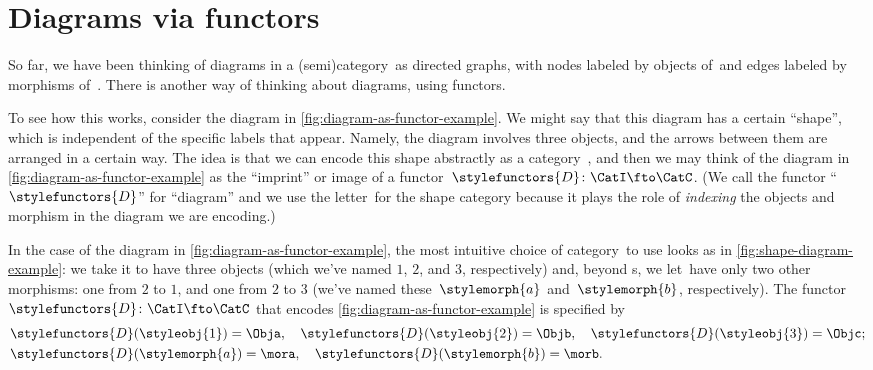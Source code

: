 
\section{Diagrams via functors}

So far, we have been thinking of diagrams in a (semi)category~\CatC as directed graphs, with nodes labeled by objects of~\CatC and edges labeled by morphisms of~\CatC.
There is another way of thinking about diagrams, using functors.

To see how this works, consider the diagram in \cref{fig:diagram-as-functor-example}.
We might say that this diagram has a certain ``shape'', which is independent of the specific labels that appear.
Namely, the diagram involves three objects, and the arrows between them are arranged in a certain way.
The idea is that we can encode this shape abstractly as a category~\CatI, and then we may think of the diagram in \cref{fig:diagram-as-functor-example} as the ``imprint'' or image of a functor~$\stylefunctors{D}\colon \CatI \fto \CatC$.
(We call the functor ``$\stylefunctors{D}$'' for ``diagram'' and we use the letter~\CatI for the shape category because it plays the role of \emph{indexing} the objects and morphism in the diagram we are encoding.)

\begin{marginfigure}
    \centering
    \caption{}
    \label{fig:diagram-as-functor-example}
\end{marginfigure}

\begin{marginfigure}
    \centering
    \caption{}
    \label{fig:shape-diagram-example}
\end{marginfigure}

In the case of the diagram in \cref{fig:diagram-as-functor-example}, the most intuitive choice of category~\CatI to use looks as in \cref{fig:shape-diagram-example}: we take it to have three objects (which we've named $1$, $2$, and $3$, respectively) and, beyond s, we let~\CatI have only two other morphisms: one from $2$ to $1$, and one from $2$ to $3$ (we've named these~$\stylemorph{a}$ and~$\stylemorph{b}$, respectively).
The functor~$\stylefunctors{D}\colon \CatI \fto \CatC$ that encodes \cref{fig:diagram-as-functor-example} is specified by
\begin{align}
     & \stylefunctors{D}(\styleobj{1}) = \Obja, \quad \stylefunctors{D}(\styleobj{2}) = \Objb, \quad  \stylefunctors{D}(\styleobj{3}) = \Objc; \\
     & \stylefunctors{D}(\stylemorph{a}) = \mora, \quad \stylefunctors{D}(\stylemorph{b}) = \morb.
\end{align}

